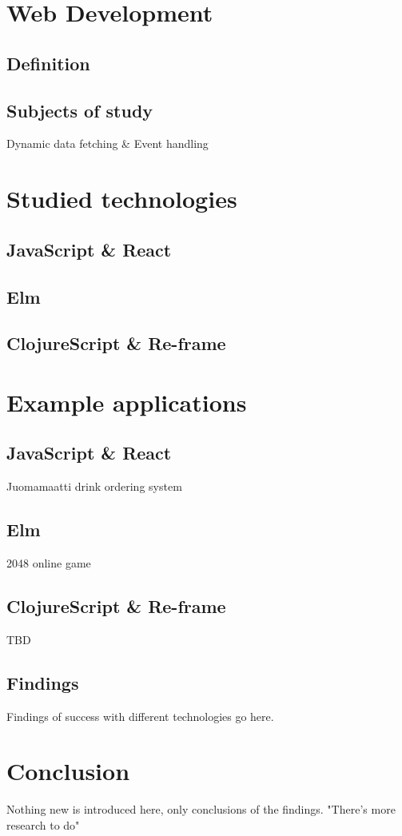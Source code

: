\documentclass[12pt, titlepage]{article}
\begin{document}
\section{Web Development}

\subsection{Definition}

\subsection{Subjects of study}
Dynamic data fetching \& Event handling

\section{Studied technologies}
\subsection{JavaScript \& React}
\subsection{Elm}
\subsection{ClojureScript \& Re-frame}

\section{Example applications}
\subsection{JavaScript \& React}
Juomamaatti drink ordering system

\subsection{Elm}
2048 online game

\subsection{ClojureScript \& Re-frame}
TBD

\subsection{Findings}
Findings of success with different technologies go here.

\section{Conclusion}
Nothing new is introduced here, only conclusions of the findings. "There's more research to do"

\renewcommand{\refname}{References}
\end{document}
